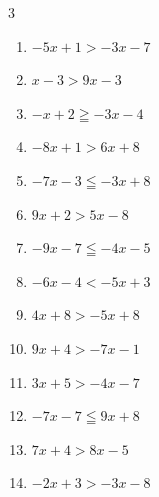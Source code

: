 \begin{multicols}{3}
\begin{enumerate}
  \item $-5x+1>-3x-7$

        \phantom{$\displaystyle x<4$}

  \item $x-3>9x-3$

        \phantom{$\displaystyle x<0$}

  \item $-x+2\geqq -3x-4$

        \phantom{$\displaystyle x\geqq -3$}

  \item $-8x+1>6x+8$


  \item $-7x-3\leqq -3x+8$


  \item $9x+2>5x-8$


  \item $-9x-7\leqq -4x-5$


  \item $-6x-4<-5x+3$

        \phantom{$\displaystyle x>-7$}

  \item $4x+8>-5x+8$

        \phantom{$\displaystyle x>0$}

  \item $9x+4>-7x-1$


  \item $3x+5>-4x-7$


  \item $-7x-7\leqq 9x+8$


\columnbreak %

\resetques

  \item $7x+4>8x-5$

        \phantom{$\displaystyle x<9$}

  \item $-2x+3>-3x-8$


\end{enumerate}
\end{multicols}
